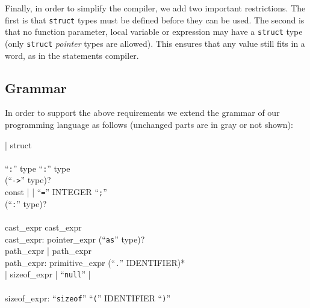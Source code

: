 Finally, in order to simplify the compiler, we add two important restrictions.
The first is that {\tt struct} types must be defined before they can be used.
The second is that no function parameter, local variable or expression may have
a {\tt struct} type (only {\tt struct} {\em pointer} types are allowed). This
ensures that any value still fits in a word, as in the statements compiler.

\subsection{Grammar}

In order to support the above requirements we extend the grammar of our
programming language as follows (unchanged parts are in gray or not shown):

\begin{Paragraph}
 | struct \\
\unchanged{$\ldots$}\\
 ``{\tt :}'' type
 ``{\tt :}'' type\\
\phantom{fn\_parameters: } (``{\tt ->}'' type)?\\
const | 
| ``{\tt =}'' INTEGER ``{\tt ;}'' \\
 (``{\tt :}'' type)?
\\
\unchanged{$\ldots$}\\
 cast\_expr 
cast\_expr\unchanged{)*}\\
cast\_expr: pointer\_expr (``{\tt as}'' type)?\\
 path\_expr |
path\_expr\\
path\_expr: primitive\_expr (``{\tt .}'' IDENTIFIER)*\\
 |
sizeof\_expr | ``{\tt null}'' |\\
\phantom{primitive\_expr: } \\
sizeof\_expr: ``{\tt sizeof}'' ``{\tt (}'' IDENTIFIER ``{\tt )}''\\
\\

\end{Paragraph}
